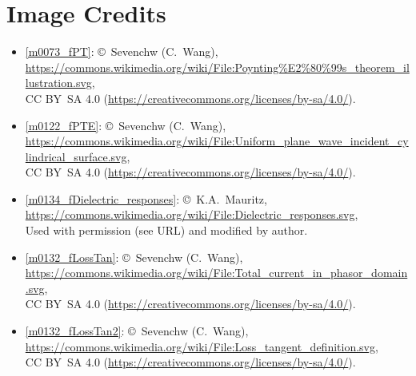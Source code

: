 

\label{m0183_Ch_End_Matter_Plane_Wave_Prop_Complex_Media} %

\onecolumn
\section*{Image Credits}

\begin{itemize}

\item[Fig.] \label{m0073_fPT_Credit}
  \ref{m0073_fPT}:
  \copyright~Sevenchw (C.\ Wang), 
  \url{https://commons.wikimedia.org/wiki/File:Poynting%E2%80%99s_theorem_illustration.svg},\\ 
  CC BY~SA 4.0 (\url{https://creativecommons.org/licenses/by-sa/4.0/}).

\item[Fig.] \label{m0122_fPTE_Credit}
  \ref{m0122_fPTE}:
  \copyright~Sevenchw (C.\ Wang), 
  \url{https://commons.wikimedia.org/wiki/File:Uniform_plane_wave_incident_cylindrical_surface.svg},\\ 
  CC BY~SA 4.0 (\url{https://creativecommons.org/licenses/by-sa/4.0/}).

\item[Fig.] \label{m0134_Dielectric_responses_credit}
  \ref{m0134_fDielectric_responses}:
  \copyright~K.A.\ Mauritz, 
  \url{https://commons.wikimedia.org/wiki/File:Dielectric_responses.svg},\\ 
  Used with permission (see URL) and modified by author.

\item[Fig.] \label{m0132_fLossTan_Credit}
  \ref{m0132_fLossTan}:
  \copyright~Sevenchw (C.\ Wang), 
  \url{https://commons.wikimedia.org/wiki/File:Total_current_in_phasor_domain.svg},\\ 
  CC BY~SA 4.0 (\url{https://creativecommons.org/licenses/by-sa/4.0/}).

\item[Fig.] \label{m0132_fLossTan2_Credit}
  \ref{m0132_fLossTan2}:
  \copyright~Sevenchw (C.\ Wang), 
  \url{https://commons.wikimedia.org/wiki/File:Loss_tangent_definition.svg},\\ 
  CC BY~SA 4.0 (\url{https://creativecommons.org/licenses/by-sa/4.0/}).

\end{itemize}

\twocolumn
